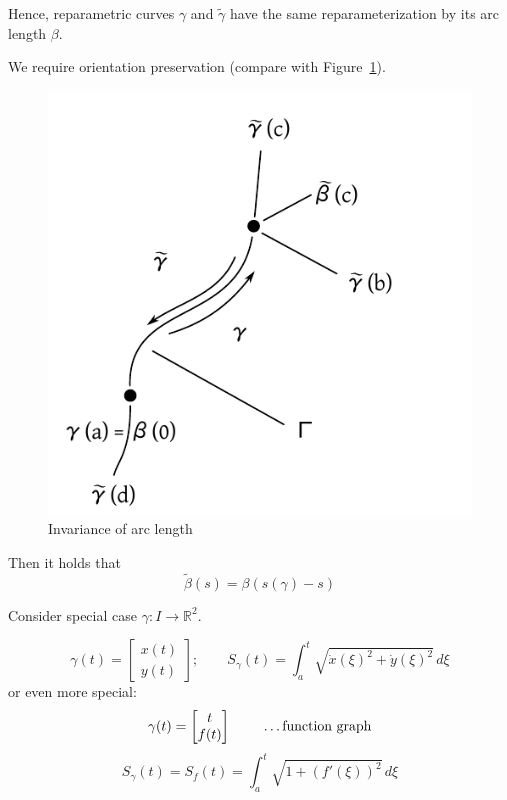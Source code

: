 \documentclass[a4paper,landscape,twocolumn]{article}
\theoremstyle{definition}
\begin{document}
Hence, reparametric curves $\gamma$ and $\tilde{\gamma}$ have the same reparameterization by its arc length $\beta$.

We require orientation preservation (compare with Figure~\ref{img:arclength}).
%
\begin{figure}[!h]
  \begin{center}
    \includegraphics{img/arc_length_invariance.pdf}
    \caption{Invariance of arc length}
    \label{img:arclength}
  \end{center}
\end{figure}

Then it holds that
\[ \tilde{\beta}(s) = \beta(s(\gamma) - s) \]

Consider special case $\gamma: I \to \mathbb R^2$.

\[
  \gamma(t) = \begin{bmatrix} x(t) \\ y(t) \end{bmatrix};
  \qquad
  S_\gamma(t) = \int_a^t \sqrt{\dot{x}(\xi)^2 + \dot{y}(\xi)^2} \, d\xi
\]
or even more special:
\[ \gamma(t) = \begin{bmatrix} t \\ f(t) \end{bmatrix} \qquad \text{ \dots function graph} \]
\[ S_\gamma(t) = S_f(t) = \int_a^t \sqrt{1 + (f'(\xi))^2} \, d\xi \]
\end{document}
